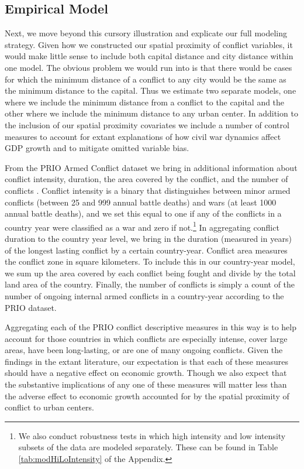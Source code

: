 \subsection{Empirical Model}

Next, we move beyond this cursory illustration and explicate our full modeling strategy. Given how we constructed our spatial proximity of conflict variables, it would make little sense to include both capital distance and city distance within one model. The obvious problem we would run into is that there would be cases for which the minimum distance of a conflict to any city would be the same as the minimum distance to the capital. Thus we estimate two separate models, one where we include the minimum distance from a conflict to the capital and the other where we include the minimum distance to any urban center. In addition to the inclusion of our spatial proximity covariates we include a number of control measures to account for extant explanations of how civil war dynamics affect GDP growth and to mitigate omitted variable bias. 

From the PRIO Armed Conflict dataset we bring in additional information about conflict intensity, duration, the area covered by the conflict, and the number of conflicts \citep{themner:wallensteen:2014}. Conflict intensity is a binary that distinguishes between minor armed conflicts (between 25 and 999 annual battle deaths) and wars (at least 1000 annual battle deaths), and we set this equal to one if any of the conflicts in a country year were classified as a war and zero if not.\footnote{We also conduct robustness tests in which high intensity and low intensity subsets of the data are modeled separately. These can be found in Table \ref{tab:modHiLoIntensity} of the Appendix.} In aggregating conflict duration to the country year level, we bring in the duration (measured in years) of the longest lasting conflict by a certain country-year. Conflict area measures the conflict zone in square kilometers. To include this in our country-year model, we sum up the area covered by each conflict being fought and divide by the total land area of the country. Finally, the number of conflicts is simply a count of the number of ongoing internal armed conflicts in a country-year according to the PRIO dataset.


Aggregating each of the PRIO conflict descriptive measures in this way is to help account for those countries in which conflicts are especially intense, cover large areas, have been long-lasting, or are one of many ongoing conflicts. Given the findings in the extant literature, our expectation is that each of these measures should have a negative effect on economic growth. Though we also expect that the substantive implications of any one of these measures will matter less than the adverse effect to economic growth accounted for by the spatial proximity of conflict to urban centers.

